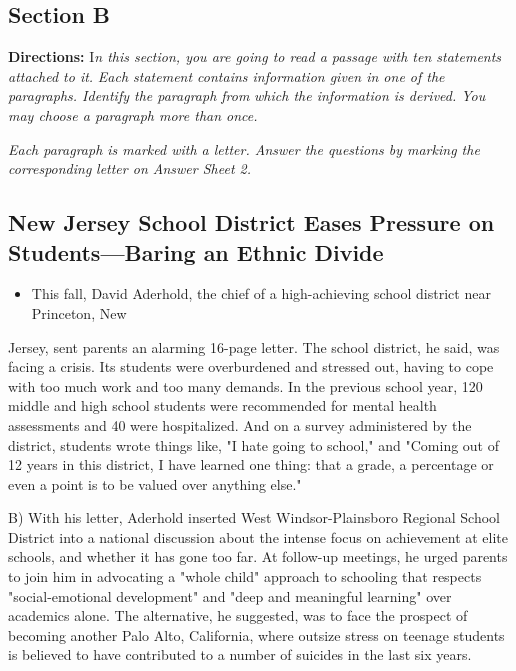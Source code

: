 \documentclass[UTF8,11pt]{ctexart}
\begin{document}
\subsection*{\textbf{Section B}}


\textbf{Directions:} I\textit{n this section, you are going to read a passage with ten statements attached to it.} \textit{Each statement contains information given in one of the paragraphs. Identify the paragraph from} \textit{which the information is derived. You may choose a paragraph more than once.}


\textit{Each paragraph is marked with a letter. Answer the questions by marking the corresponding} \textit{letter on Answer Sheet 2.}


\subsection*{\textbf{New Jersey School District Eases Pressure on Students—Baring an Ethnic Divide}}


\begin{itemize}[leftmargin=2em,itemsep=.2em,topsep=.4em]\item[A.] This fall, David Aderhold, the chief of a high-achieving school district near Princeton, New
\end{itemize}

Jersey, sent parents an alarming 16-page letter. The school district, he said, was facing a crisis. Its students were overburdened and stressed out, having to cope with too much work and too many demands. In the previous school year, 120 middle and high school students were recommended for mental health assessments and 40 were hospitalized. And on a survey administered by the district, students wrote things like, "I hate going to school," and "Coming out of 12 years in this district, I have learned one thing: that a grade, a percentage or even a point is to be valued over anything else."


B) With his letter, Aderhold inserted West Windsor-Plainsboro Regional School District into a national discussion about the intense focus on achievement at elite schools, and whether it has gone too far. At follow-up meetings, he urged parents to join him in advocating a "whole child" approach to schooling that respects "social-emotional development" and "deep and meaningful learning" over academics alone. The alternative, he suggested, was to face the prospect of becoming another Palo Alto, California, where outsize stress on teenage students is believed to have contributed to a number of suicides in the last six years.
\end{document}

